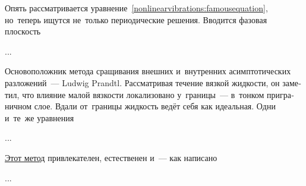 
\begin{otherlanguage}{russian}

Опять рассматривается уравнение~\eqref{nonlinearvibrations:famousequation}, но~теперь ищутся не~только периодические решения. Вводится фазовая плоскость

...



\end{otherlanguage}



\begin{otherlanguage}{russian}

Основоположник метода сращивания внешних и~внутренних асимптотических разложений~--- Ludwig Prandtl. Рассматривая течение вязкой жидкости, он заметил, что влияние малой вязкости локализовано у~границы~--- в~тонком приграничном слое. Вдали от~границы жидкость ведёт себя как идеальная. Одни и~те~же уравнения

...



\end{otherlanguage}



\begin{otherlanguage}{russian}

\href{https://en.wikipedia.org/wiki/Multiple-scale_analysis}{Этот метод} привлекателен, естественен и~--- как написано

...



\end{otherlanguage}

